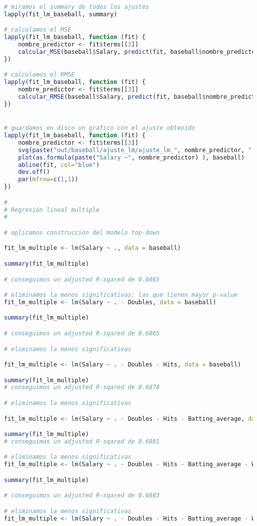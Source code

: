 \begin{lstlisting}[language=R]
# miramos el summary de todos los ajustes
lapply(fit_lm_baseball, summary)

# calculamos el MSE
lapply(fit_lm_baseball, function (fit) {
	nombre_predictor <- fit$terms[[3]]
	calcular_MSE(baseball$Salary, predict(fit, baseball$nombre_predictor))
})

# calculamos el RMSE
lapply(fit_lm_baseball, function (fit) {
	nombre_predictor <- fit$terms[[3]]
	calcular_RMSE(baseball$Salary, predict(fit, baseball$nombre_predictor))
})


# guardamos en disco un grafico con el ajuste obtenido
lapply(fit_lm_baseball, function (fit) {
	nombre_predictor <- fit$terms[[3]]
	svg(paste("out/baseball/ajuste_lm/ajuste_lm_", nombre_predictor, ".svg", sep = ""))
	plot(as.formula(paste("Salary ~", nombre_predictor) ), baseball)
	abline(fit, col="blue")
	dev.off()
	par(mfrow=c(1,1))
})

#
# Regresión lineal multiple
#

# aplicamos construcción del modelo top-down

fit_lm_multiple <- lm(Salary ~ ., data = baseball)

summary(fit_lm_multiple)

# conseguimos un adjusted R-sqared de 0.6865

# eliminamos la menos significativas: las que tienen mayor p-value
fit_lm_multiple <- lm(Salary ~ . - Doubles, data = baseball)

summary(fit_lm_multiple)

# conseguimos un adjusted R-sqared de 0.6865

# eliminamos la menos significativas

fit_lm_multiple <- lm(Salary ~ . - Doubles - Hits, data = baseball)

summary(fit_lm_multiple)
# conseguimos un adjusted R-sqared de 0.6878

# eliminamos la menos significativas

fit_lm_multiple <- lm(Salary ~ . - Doubles - Hits - Batting_average, data = baseball)

summary(fit_lm_multiple)
# conseguimos un adjusted R-sqared de 0.6881

# eliminamos la menos significativas
fit_lm_multiple <- lm(Salary ~ . - Doubles - Hits - Batting_average - Walks, data = baseball)

summary(fit_lm_multiple)

# conseguimos un adjusted R-sqared de 0.6883

# eliminamos la menos significativas
fit_lm_multiple <- lm(Salary ~ . - Doubles - Hits - Batting_average - Walks - `On-base_percentage`, data = baseball)


\end{lstlisting}
